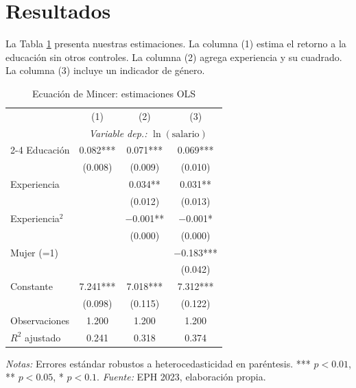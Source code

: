 \documentclass[12pt, a4paper]{article}
\theoremstyle{definition}
\theoremstyle{remark}
\begin{document}
\section{Resultados}

La Tabla \ref{tab:regresion} presenta nuestras estimaciones. La columna (1) 
estima el retorno a la educación sin otros controles. La columna (2) agrega 
experiencia y su cuadrado. La columna (3) incluye un indicador de género.

\begin{table}[htbp]
  \centering
  \caption{Ecuación de Mincer: estimaciones OLS}
  \label{tab:regresion}
  \begin{tabular}{lccc}
    \toprule
                          & (1)        & (2)        & (3)        \\
                          & \multicolumn{3}{c}{\textit{Variable dep.: } $\ln(\text{salario})$} \\
    \cmidrule(lr){2-4}
    \midrule
    Educación             & 0.082***   & 0.071***   & 0.069***   \\
                          & (0.008)    & (0.009)    & (0.010)    \\[4pt]
    Experiencia           &            & 0.034**    & 0.031**    \\
                          &            & (0.012)    & (0.013)    \\[4pt]
    Experiencia$^2$       &            & $-$0.001** & $-$0.001*  \\
                          &            & (0.000)    & (0.000)    \\[4pt]
    Mujer (=1)            &            &            & $-$0.183***\\
                          &            &            & (0.042)    \\[4pt]
    Constante             & 7.241***   & 7.018***   & 7.312***   \\
                          & (0.098)    & (0.115)    & (0.122)    \\
    \midrule
    Observaciones         & 1.200      & 1.200      & 1.200      \\
    $R^2$ ajustado        & 0.241      & 0.318      & 0.374      \\
    \bottomrule
  \end{tabular}
  \begin{minipage}{\linewidth}
    \footnotesize \textit{Notas:} Errores estándar robustos a 
    heterocedasticidad en paréntesis. *** $p<0.01$, ** $p<0.05$, 
    * $p<0.1$. \textit{Fuente:} EPH 2023, elaboración propia.
  \end{minipage}
\end{table}
\end{document}
